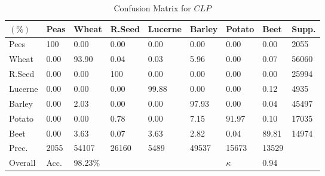 \begin{table}[tp]
	\centering
	\caption{Confusion Matrix for $CLP$}
	\label{tab:cmCLP}
	\begin{tabularx}{\columnwidth}{XXXXXXXX|X}
		\hline \noalign{\vskip 0.5mm} 
		$(\%)$   & Peas & Wheat      & R.Seed   & Lucerne      & Barley     & Potato   & Beet & Supp.     \\ \hline \noalign{\vskip 0.3mm} 
		Pees     & 100 & 0.00  & 0.00     & 0.00   & 0.00   & 0.00   & 0.00 & 2055 \\
		Wheat    & 0.00   & 93.90 & 0.04     & 0.03   & 5.96   & 0.00   & 0.07 & 56060 \\
		R.Seed   & 0.00   & 0.00  & 100   & 0.00   & 0.00   & 0.00   & 0.00 & 25994 \\
		Lucerne  & 0.00   & 0.00  & 0.00     & 99.88  & 0.00   & 0.00   & 0.12 & 4935 \\
		Barley   & 0.00   & 2.03  & 0.00     & 0.00   & 97.93  & 0.00   & 0.04 & 45497 \\
		Potato   & 0.00   & 0.00  & 0.78     & 0.00   & 7.15   & 91.97  & 0.10 & 17035 \\
		Beet     & 0.00   & 3.63  & 0.07     & 3.63   & 2.82   & 0.04   & 89.81 & 14974 \\ \hline  %
		Prec.  & 2055   & 54107 &   26160     &   5489    &  49537      &15673  & 13529 &  \\ %
		Overall  & Acc.   & 98.23\% &        &       &        &$\kappa$   & 0.94 &  \\ \hline
	\end{tabularx}
\end{table}









